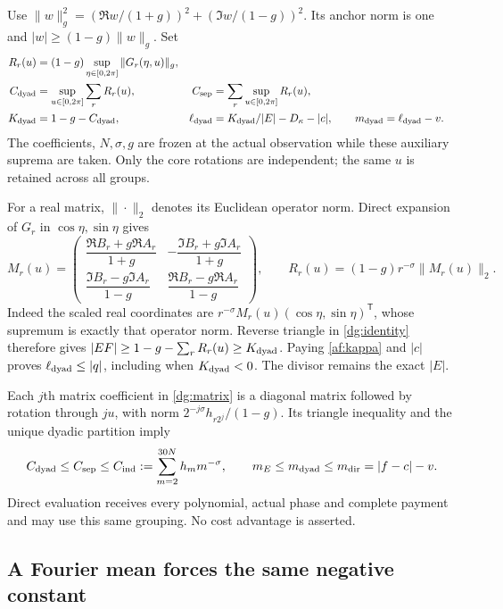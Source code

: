 Use $\|w\|_g^2=(\Re w/(1+g))^2+(\Im w/(1-g))^2$.
Its anchor norm is one and $|w|\ge(1-g)\|w\|_g$. Set
\begin{align}
 R_r(u)&=(1-g)\sup_{\eta\in[0,2\pi]}\|G_r(\eta,u)\|_g,\notag\\
 C_{\rm dyad}&=\sup_{u\in[0,2\pi]}\sum_rR_r(u),&
 C_{\rm sep}&=\sum_r\sup_{u\in[0,2\pi]}R_r(u),\notag\\
 K_{\rm dyad}&=1-g-C_{\rm dyad},&
 \ell_{\rm dyad}&=K_{\rm dyad}/|E|-D_\kappa-|c|,\qquad
 m_{\rm dyad}=\ell_{\rm dyad}-v.
 \label{dg:allowance}
\end{align}
The coefficients, $N,\sigma,g$ are frozen at the actual observation
while these auxiliary suprema are taken. Only the core rotations are
independent; the same $u$ is retained across all groups.

For a real matrix, $\|\cdot\|_2$ denotes its Euclidean operator norm.
Direct expansion of $G_r$ in $\cos\eta,\sin\eta$ gives
\begin{equation}
 M_r(u)=\begin{pmatrix}
 \dfrac{\Re B_r+g\Re A_r}{1+g}&
       -\dfrac{\Im B_r+g\Im A_r}{1+g}\\[4pt]
 \dfrac{\Im B_r-g\Im A_r}{1-g}&
        \dfrac{\Re B_r-g\Re A_r}{1-g}
 \end{pmatrix},\qquad
 R_r(u)=(1-g)r^{-\sigma}\|M_r(u)\|_2.
 \label{dg:matrix}
\end{equation}
Indeed the scaled real coordinates are
$r^{-\sigma}M_r(u)(\cos\eta,\sin\eta)^{\mathsf T}$, whose supremum
is exactly that operator norm. Reverse triangle in \eqref{dg:identity}
therefore gives $|EF|\ge1-g-\sum_rR_r(u)\ge K_{\rm dyad}$.
Paying \eqref{af:kappa} and $|c|$ proves $\ell_{\rm dyad}\le|q|$,
including when $K_{\rm dyad}<0$. The divisor remains the exact $|E|$.

Each $j$th matrix coefficient in \eqref{dg:matrix} is a diagonal
matrix followed by rotation through $ju$, with norm
$2^{-j\sigma}h_{r2^j}/(1-g)$. Its triangle inequality and the unique
dyadic partition imply
\begin{equation}
 C_{\rm dyad}\le C_{\rm sep}\le
 C_{\rm ind}:=\sum_{m=2}^{30N}h_m m^{-\sigma},\qquad
 m_E\le m_{\rm dyad}\le m_{\rm dir}=|f-c|-v.
 \label{dg:comparison}
\end{equation}
Direct evaluation receives every polynomial, actual phase and complete
payment and may use this same grouping. No cost advantage is asserted.

\subsection{A Fourier mean forces the same negative constant}

